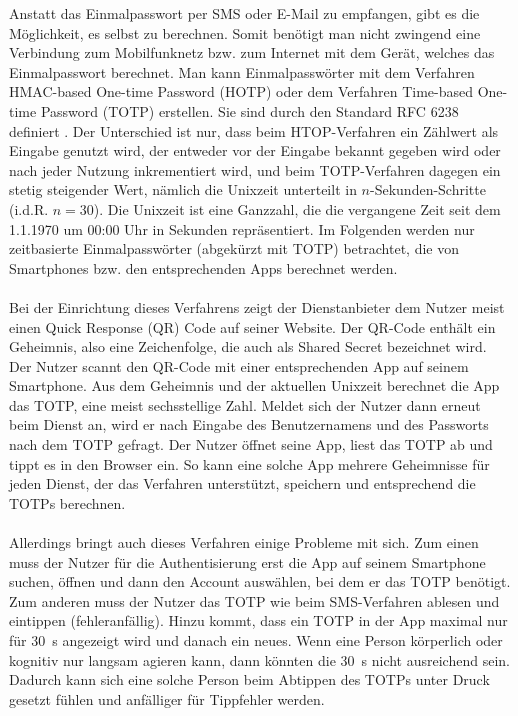 Anstatt das Einmalpasswort per SMS oder E-Mail zu empfangen, gibt es die 
Möglichkeit, es selbst zu berechnen. Somit benötigt man nicht 
zwingend eine Verbindung zum Mobilfunknetz bzw. zum Internet mit dem Gerät, welches 
das Einmalpasswort berechnet. Man kann Einmalpasswörter mit dem Verfahren HMAC-based 
One-time Password (HOTP) oder dem Verfahren Time-based One-time Password (TOTP) 
erstellen. Sie sind durch den Standard RFC 6238 definiert \autocite{rfc6238}. Der Unterschied ist 
nur, dass beim HTOP-Verfahren ein Zählwert als Eingabe genutzt wird, der entweder 
vor der Eingabe bekannt gegeben wird oder nach jeder Nutzung inkrementiert wird, und 
beim TOTP-Verfahren dagegen ein stetig steigender Wert, nämlich die Unixzeit 
unterteilt in $n$-Sekunden-Schritte (i.d.R. $n = 30$). Die Unixzeit ist eine Ganzzahl, die die 
vergangene Zeit seit dem 1.1.1970 um 00:00 Uhr in Sekunden repräsentiert. Im 
Folgenden werden nur zeitbasierte Einmalpasswörter (abgekürzt mit TOTP) betrachtet, 
die von Smartphones bzw. den entsprechenden Apps berechnet werden.
\\\\
Bei der Einrichtung dieses Verfahrens zeigt der Dienstanbieter dem Nutzer meist 
einen Quick Response (QR) Code auf seiner Website. Der QR-Code enthält ein Geheimnis, also eine Zeichenfolge, die auch als Shared Secret bezeichnet wird. Der Nutzer scannt den QR-Code mit einer entsprechenden App auf 
seinem Smartphone. Aus dem Geheimnis und der aktuellen Unixzeit berechnet die App 
das TOTP, eine meist sechsstellige Zahl. Meldet sich der Nutzer dann erneut beim 
Dienst an, wird er nach Eingabe des Benutzernamens und des Passworts nach dem TOTP 
gefragt. Der Nutzer öffnet seine App, liest das TOTP ab und tippt es in den Browser 
ein. So kann eine solche App mehrere Geheimnisse für jeden Dienst, der das Verfahren 
unterstützt, speichern und entsprechend die TOTPs berechnen.
\\\\
Allerdings bringt auch dieses Verfahren einige Probleme mit sich. Zum einen muss der 
Nutzer für die Authentisierung erst die App auf seinem Smartphone suchen, öffnen und 
dann den Account auswählen, bei dem er das TOTP benötigt. Zum anderen muss der 
Nutzer das TOTP wie beim SMS-Verfahren ablesen und eintippen (fehleranfällig). Hinzu 
kommt, dass ein TOTP in der App maximal nur für 30~s angezeigt wird und danach ein 
neues. Wenn eine Person körperlich oder kognitiv nur langsam agieren kann, dann 
könnten die 30~s nicht ausreichend sein. Dadurch kann sich eine solche Person beim 
Abtippen des TOTPs unter Druck gesetzt fühlen und anfälliger für Tippfehler werden.
